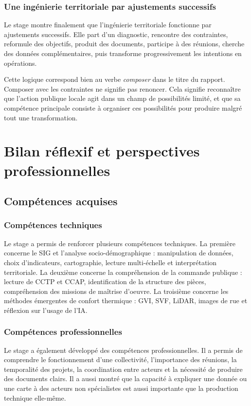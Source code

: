 \documentclass[11pt,a4paper]{report}
\begin{document}
\subsection{Une ingénierie territoriale par ajustements successifs}

Le stage montre finalement que l'ingénierie territoriale fonctionne par ajustements successifs. Elle part d'un diagnostic, rencontre des contraintes, reformule des objectifs, produit des documents, participe à des réunions, cherche des données complémentaires, puis transforme progressivement les intentions en opérations.

Cette logique correspond bien au verbe \emph{composer} dans le titre du rapport. Composer avec les contraintes ne signifie pas renoncer. Cela signifie reconnaître que l'action publique locale agit dans un champ de possibilités limité, et que sa compétence principale consiste à organiser ces possibilités pour produire malgré tout une transformation.

\chapter{Bilan réflexif et perspectives professionnelles}

\section{Compétences acquises}

\subsection{Compétences techniques}

Le stage a permis de renforcer plusieurs compétences techniques. La première concerne le SIG et l'analyse socio-démographique : manipulation de données, choix d'indicateurs, cartographie, lecture multi-échelle et interprétation territoriale. La deuxième concerne la compréhension de la commande publique : lecture de CCTP et CCAP, identification de la structure des pièces, compréhension des missions de maîtrise d'oeuvre. La troisième concerne les méthodes émergentes de confort thermique : GVI, SVF, LiDAR, images de rue et réflexion sur l'usage de l'IA.

\subsection{Compétences professionnelles}

Le stage a également développé des compétences professionnelles. Il a permis de comprendre le fonctionnement d'une collectivité, l'importance des réunions, la temporalité des projets, la coordination entre acteurs et la nécessité de produire des documents clairs. Il a aussi montré que la capacité à expliquer une donnée ou une carte à des acteurs non spécialistes est aussi importante que la production technique elle-même.
\end{document}
